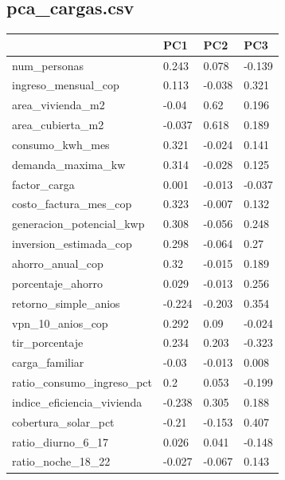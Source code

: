\subsection*{pca\_cargas.csv}
{\footnotesize\begin{longtable}{@{}p{}lll@{}}
\toprule
 & PC1 & PC2 & PC3 \\
\midrule\endhead
num\_personas & 0.243 & 0.078 & -0.139 \\
ingreso\_mensual\_cop & 0.113 & -0.038 & 0.321 \\
area\_vivienda\_m2 & -0.04 & 0.62 & 0.196 \\
area\_cubierta\_m2 & -0.037 & 0.618 & 0.189 \\
consumo\_kwh\_mes & 0.321 & -0.024 & 0.141 \\
demanda\_maxima\_kw & 0.314 & -0.028 & 0.125 \\
factor\_carga & 0.001 & -0.013 & -0.037 \\
costo\_factura\_mes\_cop & 0.323 & -0.007 & 0.132 \\
generacion\_potencial\_kwp & 0.308 & -0.056 & 0.248 \\
inversion\_estimada\_cop & 0.298 & -0.064 & 0.27 \\
ahorro\_anual\_cop & 0.32 & -0.015 & 0.189 \\
porcentaje\_ahorro & 0.029 & -0.013 & 0.256 \\
retorno\_simple\_anios & -0.224 & -0.203 & 0.354 \\
vpn\_10\_anios\_cop & 0.292 & 0.09 & -0.024 \\
tir\_porcentaje & 0.234 & 0.203 & -0.323 \\
carga\_familiar & -0.03 & -0.013 & 0.008 \\
ratio\_consumo\_ingreso\_pct & 0.2 & 0.053 & -0.199 \\
indice\_eficiencia\_vivienda & -0.238 & 0.305 & 0.188 \\
cobertura\_solar\_pct & -0.21 & -0.153 & 0.407 \\
ratio\_diurno\_6\_17 & 0.026 & 0.041 & -0.148 \\
ratio\_noche\_18\_22 & -0.027 & -0.067 & 0.143 \\
\bottomrule
\end{longtable}}
